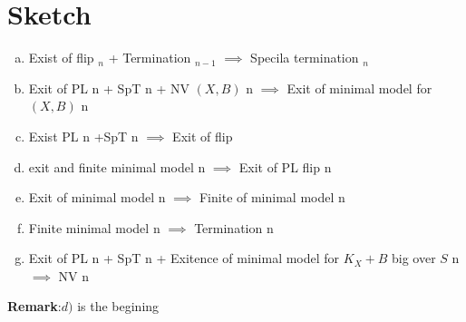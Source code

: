\documentclass{article}
\begin{document}
\section{Sketch}
\begin{enumerate}[a)]
  \item Exist of flip $_n$ + Termination $_{n-1}$ $\implies$ Specila termination $_n$ 
  \item Exit of PL n + SpT n + NV $(X,B)$ n  $\implies$ Exit of minimal model for $(X,B)$ n
  \item Exist PL n +SpT n $\implies$ Exit of flip
  \item exit and finite minimal model n $\implies$ Exit of PL flip n 
  \item Exit of minimal model n $\implies$ Finite of minimal model n 
  \item Finite minimal model n $\implies$ Termination n 
  \item Exit of PL n + SpT n + Exitence of minimal model for $K_{X}+B$ big over $S$ n $\implies$ NV n 
\end{enumerate}
\textbf{Remark}:$d)$ is the begining
\end{document}
